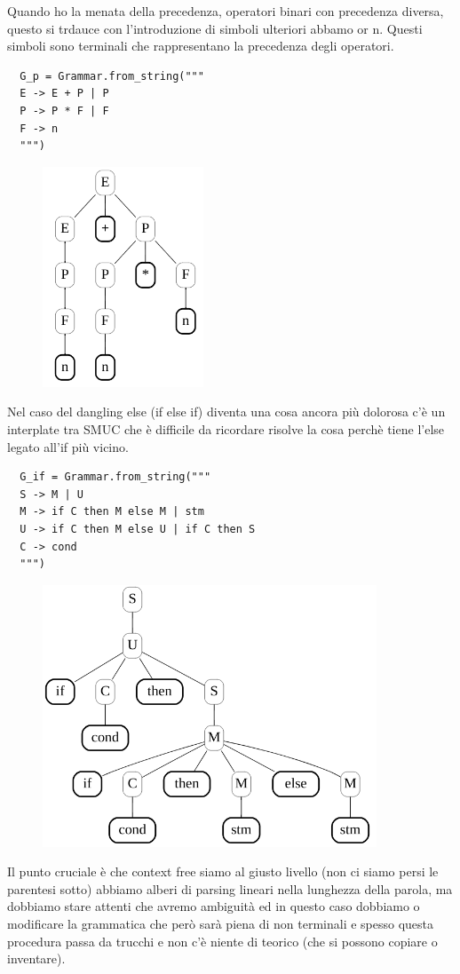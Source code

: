 Quando ho la menata della precedenza, operatori binari con precedenza diversa, questo si trdauce con l'introduzione di simboli ulteriori abbamo or n. Questi simboli sono terminali che rappresentano la precedenza degli operatori.

\begin{lstlisting}
  G_p = Grammar.from_string("""
  E -> E + P | P
  P -> P * F | F
  F -> n
  """)
\end{lstlisting}

\begin{figure}[ht!]
  \centering
  \includegraphics[scale=1]{images/AlberiParsing/precedenza.png}
\end{figure}

Nel caso del dangling else (if else if) diventa una cosa ancora più dolorosa c'è un interplate tra SMUC che è difficile da ricordare risolve la cosa perchè tiene l'else legato all'if più vicino.

\begin{lstlisting}
  G_if = Grammar.from_string("""
  S -> M | U
  M -> if C then M else M | stm
  U -> if C then M else U | if C then S
  C -> cond
  """)
\end{lstlisting}

\begin{figure}[ht!]
  \centering
  \includegraphics[scale=1]{images/AlberiParsing/dandlingElse.png}
\end{figure}

Il punto cruciale è che context free siamo al giusto livello (non ci siamo persi le parentesi sotto) abbiamo alberi di parsing lineari nella lunghezza della parola, ma dobbiamo stare attenti che avremo ambiguità ed in questo caso dobbiamo o modificare la grammatica che però sarà piena di non terminali e spesso questa procedura passa da trucchi e non c'è niente di teorico (che si possono copiare o inventare).